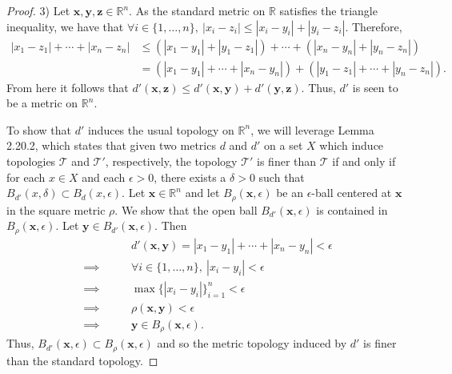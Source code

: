 \documentclass[a4paper,10pt]{article}
\newcommand{\bx}{\mathbf{x}}
\newcommand{\by}{\mathbf{y}}
\newcommand{\bz}{\mathbf{z}}
\newcommand{\RR}{\mathbb{R}}
\begin{document}
\begin{solution}
\begin{proof}
        3) Let $\bx, \by, \bz \in \RR^n$.
        As the standard metric on $\RR$ satisfies the triangle inequality, we have that $\forall i \in \{1, \ldots, n\},~ |x_i - z_i| \leq |x_i - y_i| + |y_i - z_i|$.
        Therefore,
        \begin{align*}
            |x_1 - z_1| + \cdots + |x_n - z_n|  &\leq \left(|x_1 - y_1| + |y_1 - z_1|\right) + \cdots + \left(|x_n - y_n| + |y_n - z_n|\right) \\
                                                &= \left(|x_1 - y_1| + \cdots + |x_n - y_n|\right) + \left(|y_1 - z_1| + \cdots + |y_n - z_n|\right).
        \end{align*}
        From here it follows that $d'(\bx, \bz) \leq d'(\bx, \by) + d'(\by, \bz)$.
        Thus, $d'$ is seen to be a metric on $\RR^n$.

        To show that $d'$ induces the usual topology on $\RR^n$, we will leverage Lemma 2.20.2, which states that given two metrics $d$ and $d'$ on a set $X$ which induce topologies $\mathcal{T}$ and $\mathcal{T}'$, respectively, the topology $\mathcal{T}'$ is finer than $\mathcal{T}$ if and only if for each $x \in X$ and each $\epsilon >0$, there exists a $\delta > 0$ such that $B_{d'}(x, \delta) \subset B_d(x, \epsilon)$.
        Let $\bx \in \RR^n$ and let $B_\rho(\bx, \epsilon)$ be an $\epsilon$-ball centered at $\bx$ in the square metric $\rho$.
        We show that the open ball $B_{d'}(\bx, \epsilon)$ is contained in $B_\rho(\bx, \epsilon)$.
        Let $\by \in B_{d'}(\bx, \epsilon)$.
        Then
        \begin{align*}
                            & d'(\bx, \by) = |x_1 - y_1| + \cdots + |x_n - y_n|  < \epsilon \\
            \implies\qquad  & \forall i \in \{1, \ldots, n\},~ |x_i - y_i| < \epsilon \\
            \implies\qquad  & \max \{|x_i - y_i|\}_{i=1}^n < \epsilon \\
            \implies\qquad  & \rho(\bx, \by) < \epsilon \\
            \implies\qquad  & \by \in B_\rho(\bx, \epsilon).
        \end{align*}
        Thus, $B_{d'}(\bx, \epsilon) \subset B_\rho(\bx, \epsilon)$ and so the metric topology induced by $d'$ is finer than the standard topology.


\end{proof}
\end{solution}
\end{document}
